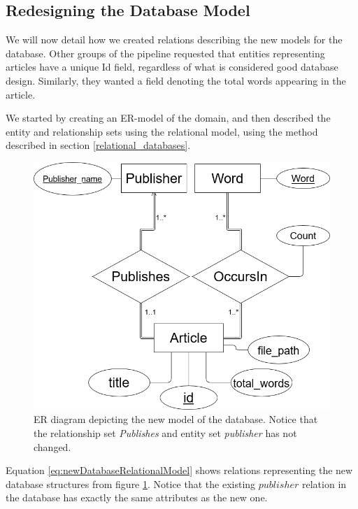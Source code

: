 \subsection{Redesigning the Database Model}\label{databaseModelRedesignNF}
We will now detail how we created relations describing the new models for the database.
Other groups of the \knox{} pipeline requested that entities representing articles have a unique Id field, regardless of what is considered good database design.
Similarly, they wanted a field denoting the total words appearing in the article.

We started by creating an ER-model of the domain, and then described the entity and relationship sets using the relational model, using the method described in section \ref{relational_databases}.

\begin{figure}[H]
    \centering
    \includegraphics[scale=0.35]{Images/FinalERDiagram.png}
    \caption{ER diagram depicting the new model of the database. Notice that the relationship set \textit{Publishes} and entity set \textit{publisher} has not changed.}
    \label{fig:newdatabaseRedesignER}
\end{figure}

Equation \ref{eq:newDatabaseRelationalModel} shows relations representing the new database structures from figure \ref{fig:newdatabaseRedesignER}.
Notice that the existing $publisher$ relation in the database has exactly the same attributes as the new one. 

